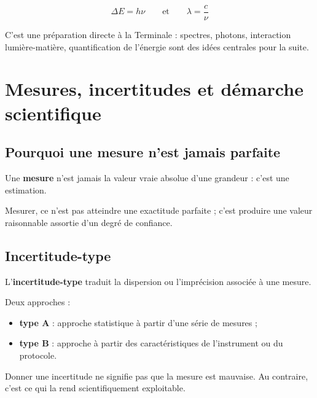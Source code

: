 \documentclass[11pt,a4paper]{article}
\begin{document}
\begin{proprbox}
\[
\Delta E=h\nu
\qquad \text{et} \qquad
\lambda=\frac{c}{\nu}
\]
\end{proprbox}

\begin{terminalebox}
C'est une préparation directe à la Terminale : spectres, photons, interaction lumière-matière, quantification de l'énergie sont des idées centrales pour la suite.
\end{terminalebox}

\newpage

\section{Mesures, incertitudes et démarche scientifique}

\subsection{Pourquoi une mesure n'est jamais parfaite}

\begin{definitionbox}
Une \textbf{mesure} n'est jamais la valeur vraie absolue d'une grandeur : c'est une estimation.
\end{definitionbox}

\begin{sensbox}
Mesurer, ce n'est pas atteindre une exactitude parfaite ; c'est produire une valeur raisonnable assortie d'un degré de confiance.
\end{sensbox}

\subsection{Incertitude-type}

\begin{definitionbox}
L'\textbf{incertitude-type} traduit la dispersion ou l'imprécision associée à une mesure.
\end{definitionbox}

Deux approches :
\begin{itemize}
    \item \textbf{type A} : approche statistique à partir d'une série de mesures ;
    \item \textbf{type B} : approche à partir des caractéristiques de l'instrument ou du protocole.
\end{itemize}

\begin{attentionbox}
Donner une incertitude ne signifie pas que la mesure est mauvaise.  
Au contraire, c'est ce qui la rend scientifiquement exploitable.
\end{attentionbox}
\end{document}
